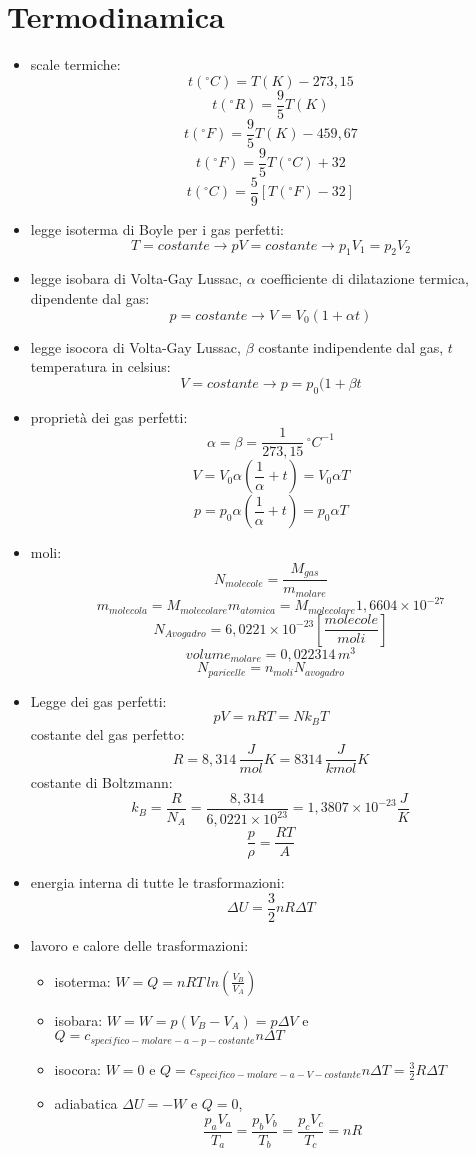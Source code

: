 \documentclass[a4paper,12pt, oneside]{book}
\begin{document}
\section{Termodinamica}
\begin{itemize}
\item scale termiche:
$$t(^{\circ}C)=T(K)-273,15$$
$$t(^{\circ}R)=\frac{9}{5} T(K)$$
$$t(^{\circ}F)=\frac{9}{5} T(K)-459,67$$
$$t(^{\circ}F)=\frac{9}{5} T(^{\circ}C)+32$$
$$t(^{\circ}C)=\frac{5}{9} [T(^{\circ}F)-32]$$
\item legge isoterma di Boyle per i gas perfetti:
$$T=costante\to pV=costante\to p_1V_1=p_2V_2$$
\item legge isobara di Volta-Gay Lussac, $\alpha$ coefficiente di dilatazione termica, dipendente dal gas:
$$p=costante\to V=V_0(1+\alpha t)$$
\item legge isocora di Volta-Gay Lussac, $\beta$ costante indipendente dal gas, $t$ temperatura in celsius:
$$V=costante\to p=p_0(1+\beta t$$
\item proprietà dei gas perfetti:
$$\alpha=\beta=\frac{1}{273,15} {\,}^\circ C^{-1}$$
$$V=V_0\alpha\left(\frac{1}{\alpha}+t\right)=V_0\alpha T$$
$$p=p_0\alpha\left(\frac{1}{\alpha}+t\right)=p_0\alpha T$$
\item moli:
$$N_{molecole}=\frac{M_{gas}}{m_{molare}}$$
$$m_{molecola}=M_{molecolare}m_{atomica}=M_{molecolare}1,6604\times 10^{-27}$$
$$N_{Avogadro}=6,0221\times 10^{-23}\left[\frac{molecole}{moli}\right]$$
$$volume_{molare}=0,022314\,m^3$$
$$N_{paricelle}=n_{moli}N_{avogadro}$$
\item Legge dei gas perfetti:
$$pV=nRT=Nk_BT$$
costante del gas perfetto:
$$R=8,314\,\frac{J}{mol}K=8314\,\frac{J}{kmol}K$$
costante di Boltzmann:
$$k_B=\frac{R}{N_A}=\frac{8,314}{6,0221\times 10^{23}}=1,3807\times 10^{-23}\frac{J}{K}$$
$$\frac{p}{\rho}=\frac{RT}{A}$$
\item energia interna di tutte le trasformazioni:
$$\Delta U=\frac{3}{2}nR\Delta T$$
\item lavoro e calore delle trasformazioni:
\begin{itemize}
\item isoterma: $W=Q=nRT\,ln\left(\frac{V_B}{V_A}\right)$
\item isobara: $W=W=p(V_B-V_A)=p\Delta V$ e
				$Q=c_{specifico-molare-a-p-costante}n\Delta T$
\item isocora: $W=0$ e $Q=c_{specifico-molare-a-V-costante}n\Delta T=\frac{3}{2}R\Delta T$
\item adiabatica $\Delta U=-W$ e $Q=0$, $$\frac{p_aV_a}{T_a}=\frac{p_bV_b}{T_b}=\frac{p_cV_c}{T_c}=nR$$

\end{itemize}
\end{itemize}
\end{document}
